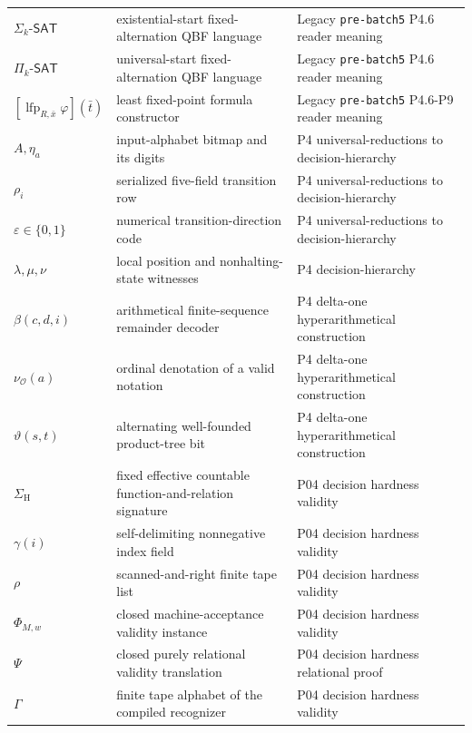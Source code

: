 \begin{longtable}{@{}p{}p{}p{}@{}}
\(\Sigma_k\text{-}\mathsf{SAT}\) & existential-start fixed-alternation QBF language & Legacy \texttt{pre-\allowbreak{}batch5} P4.\allowbreak{}6 reader meaning \\
\(\Pi_k\text{-}\mathsf{SAT}\) & universal-start fixed-alternation QBF language & Legacy \texttt{pre-\allowbreak{}batch5} P4.\allowbreak{}6 reader meaning \\
\([\operatorname{lfp}_{R,\bar x}\varphi](\bar t)\) & least fixed-point formula constructor & Legacy \texttt{pre-\allowbreak{}batch5} P4.\allowbreak{}6-\allowbreak{}P9 reader meaning \\
\(A,\allowbreak \eta_a\) & input-alphabet bitmap and its digits & P4 universal-\allowbreak{}reductions to decision-\allowbreak{}hierarchy \\
\(\rho_i\) & serialized five-field transition row & P4 universal-\allowbreak{}reductions to decision-\allowbreak{}hierarchy \\
\(\varepsilon\in\{0,\allowbreak 1\}\) & numerical transition-direction code & P4 universal-\allowbreak{}reductions to decision-\allowbreak{}hierarchy \\
\(\lambda,\allowbreak \mu,\allowbreak \nu\) & local position and nonhalting-state witnesses & P4 decision-\allowbreak{}hierarchy \\
\(\beta(c,\allowbreak d,\allowbreak i)\) & arithmetical finite-sequence remainder decoder & P4 delta-\allowbreak{}one hyperarithmetical construction \\
\(\nu_{\mathcal O}(a)\) & ordinal denotation of a valid notation & P4 delta-\allowbreak{}one hyperarithmetical construction \\
\(\vartheta(s,\allowbreak t)\) & alternating well-founded product-tree bit & P4 delta-\allowbreak{}one hyperarithmetical construction \\
\(\Sigma_{\mathrm H}\) & fixed effective countable function-and-relation signature & P04 decision hardness validity \\
\(\gamma(i)\) & self-delimiting nonnegative index field & P04 decision hardness validity \\
\(\rho\) & scanned-and-right finite tape list & P04 decision hardness validity \\
\(\Phi_{M,w}\) & closed machine-acceptance validity instance & P04 decision hardness validity \\
\(\Psi\) & closed purely relational validity translation & P04 decision hardness relational proof \\
\(\Gamma\) & finite tape alphabet of the compiled recognizer & P04 decision hardness validity \\

\end{longtable}
